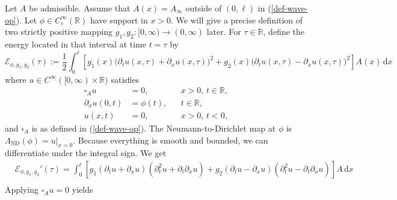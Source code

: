 \documentclass[10pt,a4paper]{article}
\theoremstyle{plain}
\theoremstyle{definition}
\theoremstyle{remark}
\numberwithin{equation}{section}
\newcommand{\R}{\mathbb{R}}
\newcommand{\dx}{\,\mathrm{d}x}
\newcommand{\ND}{\Lambda_{\text{ND}}}
\begin{document}
Let $A$ be admissible. Assume that $A(x)=A_\infty$ outside of $(0,\ell)$ in (\ref{def-wave-op}). Let $\phi \in C^\infty_c(\R)$ have support in $x >0$.  We will give a precise definition of two strictly positive mapping $g_1,g_2 \colon [0,\infty) \to (0,\infty)$ later. For $\tau\in\R$, define the energy located in that interval at time $t=\tau$ by
\begin{equation}
  \label{eq:energy-def}
  \mathscr{E}_{\phi,g_1,g_2}(\tau) := 
  \frac{1}{2} \int_0^\ell \left[ g_1(x)\big(\partial_t u(x,\tau) + \partial_x u(x,\tau)\big)^2 + g_2(x)\big(\partial_t u(x,\tau) - \partial_x u(x,\tau)\big)^2 \right] A(x) \dx
\end{equation}
where $u \in C^\infty ( [0,\infty) \times \R)$ satisfies
\begin{align}
  \square_A u &= 0, && x>0,\, t\in\R,\label{eq:energy-wave-u}\\
 \partial_x u(0,t) &= \phi(t), && t\in\R,\\
  u(x,t) &= 0, && x>0,\, t<0,
\end{align}
and $\square_A$ is as defined in (\ref{def-wave-op}). 
The Neumann-to-Dirichlet map at $\phi$ is $\ND(\phi) = u|_{x=0}$. 
Because everything is smooth and bounded, we can differentiate under the integral sign. We get
\begin{align*}
  &\mathscr{E}_{\phi,g_1,g_2}'(\tau) = \int_0^\ell \left[
    g_1 (\partial_t u + \partial_x u) (\partial_t^2 u + \partial_t\partial_x u) + g_2 (\partial_t u - \partial_x u) (\partial_t^2 u - \partial_t\partial_x u)
    \right] A \dx \\
    \end{align*}
 Applying $\square_A u = 0$ yields 
\end{document}
